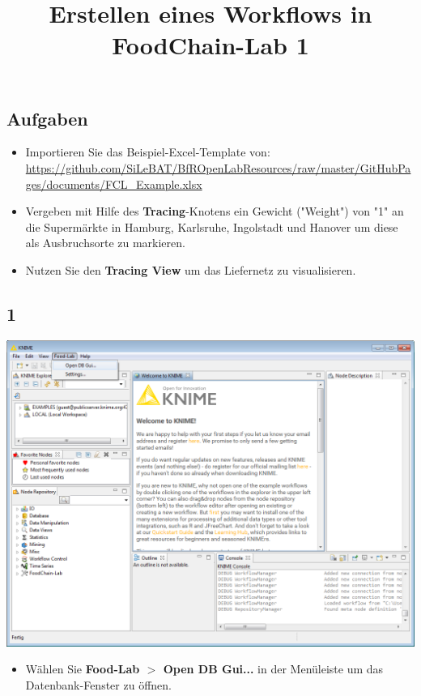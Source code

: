 \documentclass{beamer}
\title{Erstellen eines Workflows in FoodChain-Lab 1}
\date{}
\begin{document}
\maketitle

\section{ }

\subsection{Aufgaben}
\begin{frame}
	\begin{itemize}
		\item Importieren Sie das Beispiel-Excel-Template von: \url{https://github.com/SiLeBAT/BfROpenLabResources/raw/master/GitHubPages/documents/FCL_Example.xlsx}
		\item Vergeben mit Hilfe des \textbf{Tracing}-Knotens ein Gewicht ("Weight") von "1" an die Supermärkte in Hamburg, Karlsruhe, Ingolstadt und Hanover um diese als Ausbruchsorte zu markieren.
		\item Nutzen Sie den \textbf{Tracing View} um das Liefernetz zu visualisieren.
	\end{itemize}
\end{frame}
 
\subsection{1}
\begin{frame}
	\begin{center}
  		\includegraphics[height=0.6\textheight]{1.png}
	\end{center}
	\begin{itemize}
		\item Wählen Sie \textbf{Food-Lab $>$ Open DB Gui...} in der Menüleiste um das Datenbank-Fenster zu öffnen.
	\end{itemize}
\end{frame}
\end{document}
